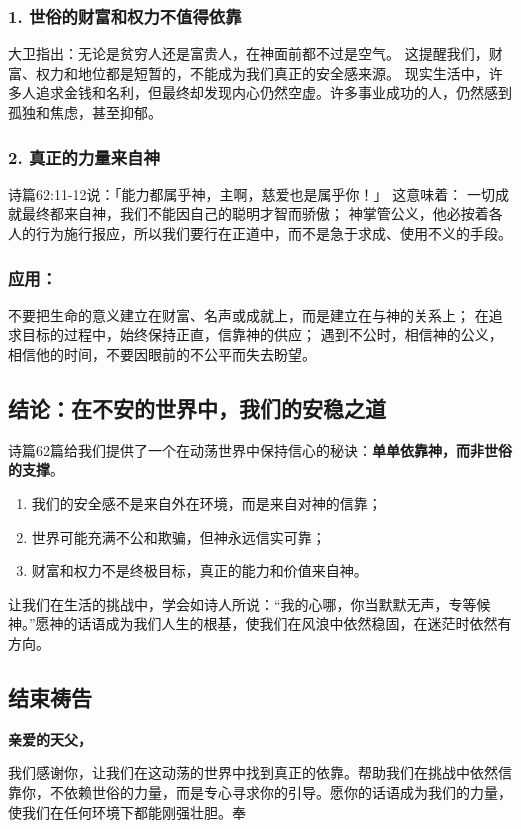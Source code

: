 \documentclass[a4paper, 12pt]{article}
\begin{document}
\subsubsection*{1. 世俗的财富和权力不值得依靠}
大卫指出：无论是贫穷人还是富贵人，在神面前都不过是空气。 这提醒我们，财富、权力和地位都是短暂的，不能成为我们真正的安全感来源。
现实生活中，许多人追求金钱和名利，但最终却发现内心仍然空虚。许多事业成功的人，仍然感到孤独和焦虑，甚至抑郁。
\subsubsection*{2. 真正的力量来自神}
诗篇62:11-12说：「能力都属乎神，主啊，慈爱也是属乎你！」 这意味着：
一切成就最终都来自神，我们不能因自己的聪明才智而骄傲；
神掌管公义，他必按着各人的行为施行报应，所以我们要行在正道中，而不是急于求成、使用不义的手段。
\subsubsection*{应用：}
不要把生命的意义建立在财富、名声或成就上，而是建立在与神的关系上；
在追求目标的过程中，始终保持正直，信靠神的供应；
遇到不公时，相信神的公义，相信他的时间，不要因眼前的不公平而失去盼望。
\subsection*{结论：在不安的世界中，我们的安稳之道}
诗篇62篇给我们提供了一个在动荡世界中保持信心的秘诀：\textbf{单单依靠神，而非世俗的支撑}。
\begin{enumerate}
    \item 我们的安全感不是来自外在环境，而是来自对神的信靠；

    \item 世界可能充满不公和欺骗，但神永远信实可靠；

    \item 财富和权力不是终极目标，真正的能力和价值来自神。

\end{enumerate}

让我们在生活的挑战中，学会如诗人所说：“我的心哪，你当默默无声，专等候神。”愿神的话语成为我们人生的根基，使我们在风浪中依然稳固，在迷茫时依然有方向。
\subsection*{结束祷告}
\textbf{亲爱的天父，}

我们感谢你，让我们在这动荡的世界中找到真正的依靠。帮助我们在挑战中依然信靠你，不依赖世俗的力量，而是专心寻求你的引导。愿你的话语成为我们的力量，使我们在任何环境下都能刚强壮胆。奉
\end{document}

